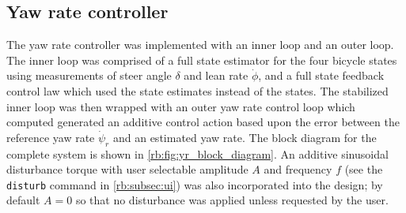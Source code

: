 \subsection{Yaw rate controller} \label{rb:subsec:yr_control}
The yaw rate controller was implemented with an inner loop and an outer loop.
The inner loop was comprised of a full state estimator for the four bicycle
states using measurements of steer angle $\delta$ and lean rate $\dot{\phi}$,
and a full state feedback control law which used the state estimates instead of
the states. The stabilized inner loop was then wrapped with an outer yaw rate
control loop which computed generated an additive control action based upon the
error between the reference yaw rate $\dot{\psi}_r$ and an estimated yaw rate.
The block diagram for the complete system is shown in
\autoref{rb:fig:yr_block_diagram}. An additive sinusoidal disturbance torque
with user selectable amplitude $A$ and frequency $f$ (see the \verb|disturb|
command in \autoref{rb:subsec:ui}) was also incorporated into the design; by
default $A=0$ so that no disturbance was applied unless requested by the user.

